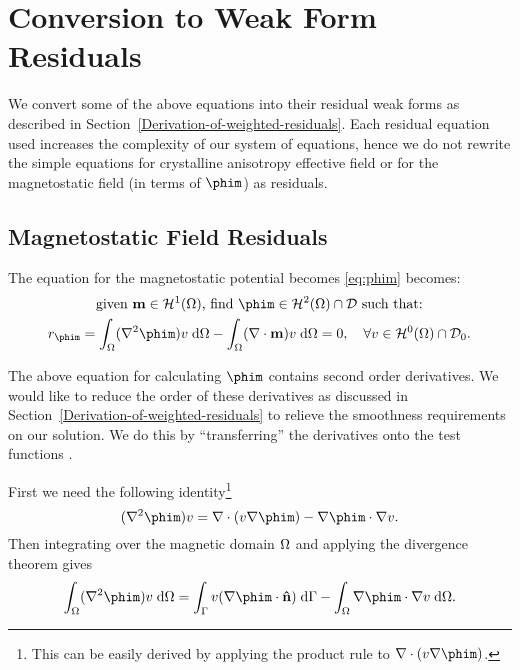 




\section{Conversion to Weak Form Residuals}

We convert some of the above equations into their residual weak forms as described in Section~\ref{Derivation-of-weighted-residuals}. Each residual equation used increases the complexity of our system of equations, hence we do not rewrite the simple equations for crystalline anisotropy effective field or for the magnetostatic field (in terms of $\phim$) as residuals.


\subsection{Magnetostatic Field Residuals}
\label{sec:magn-field-resid}

The equation for the magnetostatic potential becomes \eqref{eq:phim} becomes:
\begin{gather}
  \text{given $\mv \in \sob^1(\magd)$, find $\phim \in \sob^2(\magd) \cap \Dfs$ such that:} \notag \\
  r_{\phim} = \int_\magd (\lap \phim) v  \d \magd
  - \int_\magd (\nabla \cdot \mv) v \d \magd = 0,
  \quad \forall v \in \sob^0(\magd) \cap \Dfs_0. \label{eqn:phires1}
\end{gather}

The above equation for calculating $\phim$ contains second order derivatives.
We would like to reduce the order of these derivatives as discussed in Section~\ref{Derivation-of-weighted-residuals} to relieve the smoothness requirements on our solution.
We do this by ``transferring'' the derivatives onto the test functions \cite{HowardElmanDavidSilvester2006}.

First we need the following identity\footnote{This can be easily derived by applying the product rule to $\nabla \cdot (v \nabla \phim)$.}
\begin{equation}
  (\lap \phim) v =
  \nabla \cdot (v \nabla \phim)
  - \nabla \phim \cdot \nabla v.
  \label{eq:20}
\end{equation}
Then integrating over the magnetic domain $\Omega$ and applying the divergence theorem gives
\begin{equation}
  \int_\magd (\lap \phim) v \d \magd =
  \int_{\boundd} v (\nabla \phim \cdot \nv) \d \boundd
  - \int_\magd \nabla \phim \cdot \nabla v \d \magd.
  \label{eqn:identitygauss}
\end{equation}

